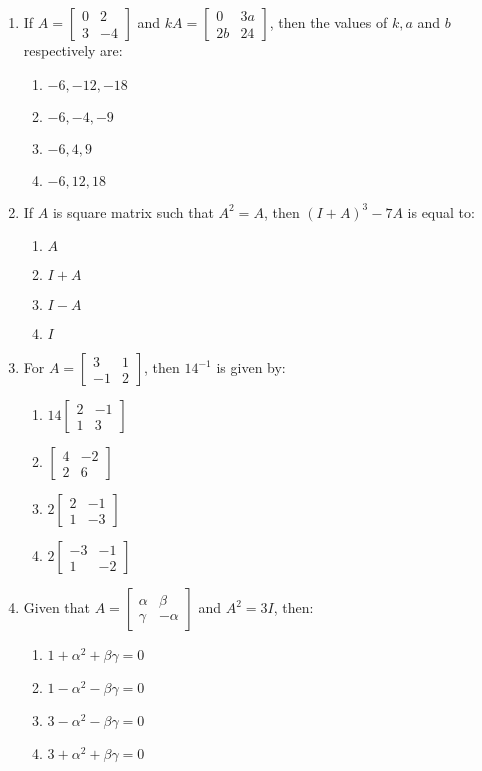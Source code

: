 \documentclass{article}
\newcommand{\myvec}[1]{\begin{bmatrix}#1\end{bmatrix}}
\begin{document}
\begin{enumerate}
    \item If $A =\myvec{0&2\\3&-4}$ and $kA =\myvec{0&3a\\2b&24}$, then the values of $k ,a$ and $b$ respectively are:\\
    \begin{enumerate}
        \item $-6, -12, -18$
        \item $-6, -4, -9$
        \item $-6, 4, 9$
        \item $-6, 12, 18$
    \end{enumerate}
    
    \item If $A$ is square matrix such that $A^2 = A$, then $(I + A)^3 - 7A$ is equal to:\\
    \begin{enumerate}
        \item $A$
        \item $I + A$
        \item $I - A$
        \item $I$ 
    \end{enumerate}
    
    \item For $A =\myvec{3&1\\-1& 2}$, then $14^{-1}$ is given by:\\
    \begin{enumerate}
        \item $14 \myvec{2 &-1\\1 &3}$
        \item $\myvec{4 &-2\\2&6}$
        \item $2\myvec{2&-1\\1&-3}$
        \item $2\myvec{-3&-1\\1&-2}$
    \end{enumerate}
    
    \item Given that $A = 
        \myvec{\alpha & \beta \\ \gamma & -\alpha}$ and $A^2 = 3I$, then:
    \begin{enumerate}
        \item $1 + \alpha^2 + \beta\gamma = 0$
        \item $1 - \alpha^2 - \beta\gamma = 0$
        \item $3 - \alpha^2 - \beta\gamma = 0$
        \item $3 + \alpha^2 + \beta\gamma = 0$
    \end{enumerate}
    

\end{enumerate}
\end{document}
